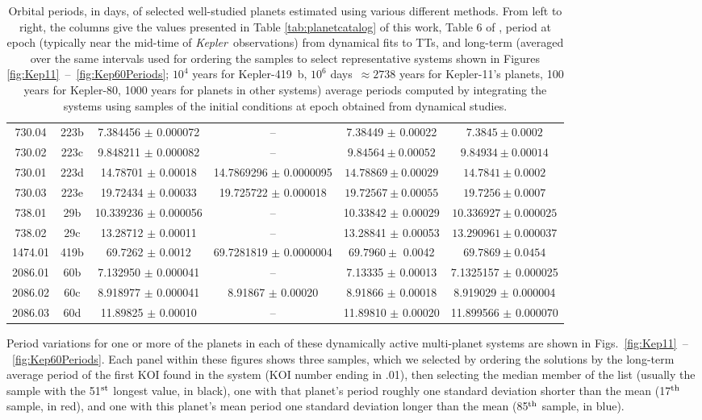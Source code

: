 \documentclass{aastex62}
\newcommand{\ik}{{\it Kepler~}}
\begin{document}
\begin{table}[]
\begin{tabular}{|c|c||c|c|c|c|}
        730.04 & 223b &  7.384456 $\pm$ 0.000072 & -- &  7.38449 $\pm$ 0.00022& $ 7.3845\pm0.0002$ \\
        730.02 & 223c & 9.848211 $\pm$ 0.000082 & -- &  $9.84564\pm0.00052$ & $9.84934\pm0.00014$  \\
        730.01 & 223d  & 14.78701 $\pm$ 0.00018 & 14.7869296 $\pm$ 0.0000095 & $14.78869\pm0.00029$  & $14.7841\pm0.0002$ \\
        730.03 & 223e & 19.72434 $\pm$ 0.00033 & 19.725722 $\pm$ 0.000018 &  $19.72567\pm0.00055$ & $19.7256\pm0.0007$  \\
        738.01 & 29b  & 10.339236 $\pm$ 0.000056 & -- & 10.33842 $\pm$ 0.00029  & $10.336927\pm 0.000025$  \\
        738.02 & 29c & 13.28712 $\pm$ 0.00011 & -- & 13.28841 $\pm$ 0.00053 & $13.290961\pm 0.000037$ \\
        1474.01 & 419b & 69.7262 $\pm$ 0.0012 & 69.7281819 $\pm$ 0.0000004 &  $69.7960\pm$ 0.0042 &    $69.7869 \pm 0.0454 $  \\ 
        2086.01 & 60b & 7.132950 $\pm$ 0.000041 & -- & 7.13335 $\pm$ 0.00013 & 7.1325157 $\pm$ 0.000025 \\ 
        2086.02 & 60c & 8.918977 $\pm$ 0.000041 & 8.91867 $\pm$ 0.00020 &  8.91866 $\pm$ 0.00018 & 8.919029 $\pm$ 0.000004 \\
        2086.03 & 60d & 11.89825 $\pm$ 0.00010 & -- &  11.89810 $\pm$ 0.00020 & 11.899566 $\pm$ 0.000070 \\
        \hline
    \end{tabular} 
 \caption{Orbital periods, in days, of selected well-studied planets estimated using various different methods. From left to right, the columns give the values presented in Table \ref{tab:planetcatalog} of this work, Table 6 of \cite{Holczer:2016}, period at epoch (typically near the mid-time of \ik observations) from dynamical fits to TTs, and long-term (averaged over the same intervals used for ordering the samples to select representative systems shown in Figures \ref{fig:Kep11}~--~\ref{fig:Kep60Periods};  $10^4$ years for Kepler-419~b, $10^6$ days~$\approx 2738$ years for Kepler-11's planets, 100 years for Kepler-80, 1000 years for planets in other systems) average periods computed by integrating the systems using samples of the initial conditions at epoch obtained from dynamical studies.}
    \label{tab:periods}
\end{table}



Period variations for one or more of the planets in each of these dynamically active multi-planet systems are shown in Figs.~\ref{fig:Kep11}~--~\ref{fig:Kep60Periods}.  Each panel within these figures shows three samples, which we selected by ordering the solutions by the  long-term average period of the first KOI found in the system (KOI number ending in .01), then selecting  the median member of the list (usually the sample with the 51$^{\rm st}$ longest value, in black), one with that planet's period roughly one standard deviation shorter than the mean (17$^{\rm th}$ sample, in red), and one with this planet's mean period one standard deviation longer than the mean (85$^{\rm th}$ sample, in blue).
\end{document}
